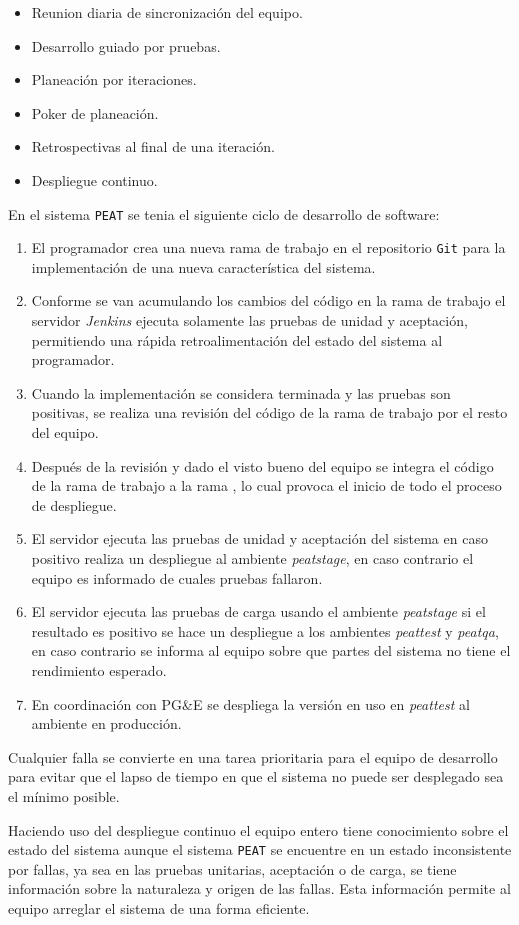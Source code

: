 \begin{itemize}
  \item Reunion diaria de sincronización del equipo.
  \item Desarrollo guiado por pruebas.
  \item Planeación por iteraciones.
  \item Poker de planeación.
  \item Retrospectivas al final de una iteración.
  \item Despliegue continuo.
\end{itemize}

En el sistema \texttt{PEAT} se tenia el siguiente ciclo de desarrollo de
software:

\begin{enumerate}
\item El programador crea una nueva rama de trabajo en el repositorio \texttt{Git}
  para la implementación de una nueva característica del sistema.
\item Conforme se van acumulando los cambios del código en la rama de trabajo
  el servidor \textit{Jenkins} ejecuta solamente las pruebas de unidad y aceptación,
  permitiendo una rápida retroalimentación del estado del sistema al programador.
\item Cuando la implementación se considera terminada y las pruebas son positivas,
  se realiza una revisión del código de la rama de trabajo por el resto del
  equipo.
\item Después de la revisión y dado el visto bueno del equipo se integra el
  código de la rama de trabajo a la rama , lo cual provoca el
  inicio de todo el proceso de despliegue.
\item El servidor ejecuta las pruebas de unidad y aceptación del sistema en
  caso positivo realiza un despliegue al ambiente \textit{peatstage}, en caso
  contrario el equipo es informado de cuales pruebas fallaron.
\item El servidor ejecuta las pruebas de carga usando el ambiente \textit{peatstage}
  si el resultado es positivo se hace un despliegue a los ambientes \textit{peattest}
  y \textit{peatqa}, en caso contrario se informa al equipo sobre que partes del
  sistema no tiene el rendimiento esperado.
\item En coordinación con PG\&E se despliega la versión en uso en \textit{peattest}
  al ambiente en producción.
\end{enumerate}

Cualquier falla se convierte en una tarea prioritaria para el equipo de desarrollo
para evitar que el lapso de tiempo en que el sistema no puede ser desplegado sea
el mínimo posible.

Haciendo uso del despliegue continuo el equipo entero tiene conocimiento sobre el
estado del sistema aunque el sistema \texttt{PEAT} se encuentre en un estado
inconsistente por fallas, ya sea en las pruebas unitarias, aceptación o de carga,
se tiene información sobre la naturaleza y origen de las fallas. Esta información
permite al equipo arreglar el sistema de una forma eficiente.
